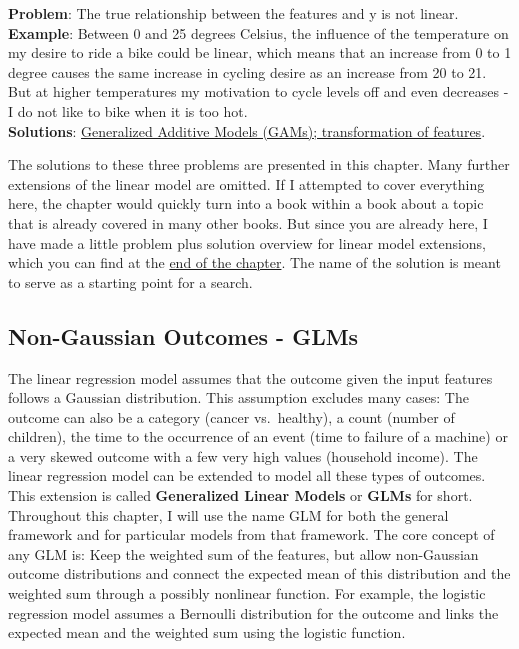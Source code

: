 \documentclass[12pt,]{krantz}
\begin{document}
\textbf{Problem}: The true relationship between the features and y is
not linear.\\
\textbf{Example}: Between 0 and 25 degrees Celsius, the influence of the
temperature on my desire to ride a bike could be linear, which means
that an increase from 0 to 1 degree causes the same increase in cycling
desire as an increase from 20 to 21. But at higher temperatures my
motivation to cycle levels off and even decreases - I do not like to
bike when it is too hot.\\
\textbf{Solutions}: \protect\hyperlink{gam}{Generalized Additive Models
(GAMs); transformation of features}.

The solutions to these three problems are presented in this chapter.
Many further extensions of the linear model are omitted. If I attempted
to cover everything here, the chapter would quickly turn into a book
within a book about a topic that is already covered in many other books.
But since you are already here, I have made a little problem plus
solution overview for linear model extensions, which you can find at the
\protect\hyperlink{more-lm-extension}{end of the chapter}. The name of
the solution is meant to serve as a starting point for a search.

\hypertarget{glm}{\subsection{Non-Gaussian Outcomes - GLMs}\label{glm}}

The linear regression model assumes that the outcome given the input
features follows a Gaussian distribution. This assumption excludes many
cases: The outcome can also be a category (cancer vs.~healthy), a count
(number of children), the time to the occurrence of an event (time to
failure of a machine) or a very skewed outcome with a few very high
values (household income). The linear regression model can be extended
to model all these types of outcomes. This extension is called
\textbf{Generalized Linear Models} or \textbf{GLMs} for short.
Throughout this chapter, I will use the name GLM for both the general
framework and for particular models from that framework. The core
concept of any GLM is: Keep the weighted sum of the features, but allow
non-Gaussian outcome distributions and connect the expected mean of this
distribution and the weighted sum through a possibly nonlinear function.
For example, the logistic regression model assumes a Bernoulli
distribution for the outcome and links the expected mean and the
weighted sum using the logistic function.
\end{document}
